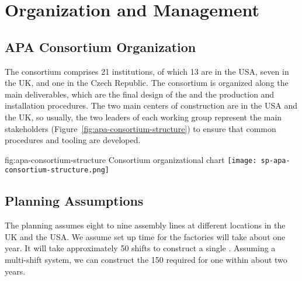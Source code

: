 \section{Organization and Management}
\label{sec:fdsp-apa-org}



\subsection{APA Consortium Organization}
\label{sec:fdsp-apa-org-consortium}

The  consortium comprises \num{21} institutions, of which \num{13} are in the USA, seven in the UK, and one in the Czech Republic. The consortium is organized along the main deliverables, which are the final design of the  and the  production and installation procedures. The two main centers of  construction are in the USA and the UK, so usually, the two leaders of each working group represent the main stakeholders (Figure~\ref{fig:apa-consortium-structure}) to ensure that common procedures and tooling are developed. 

\begin{dunefigure}{fig:apa-consortium-structure}
{ Consortium organizational chart}
\texttt{[image: sp-apa-consortium-structure.png]}
\end{dunefigure}


\subsection{Planning Assumptions}
\label{sec:fdsp-apa-org-assmp}

The planning assumes eight to nine  assembly lines at different locations in the UK and the USA. 
We assume set up time for the factories will take about one year.
It will take approximately \num{50} shifts to construct a single . Assuming a multi-shift system, we can construct the \num{150}  required for one  %
within about two years.

